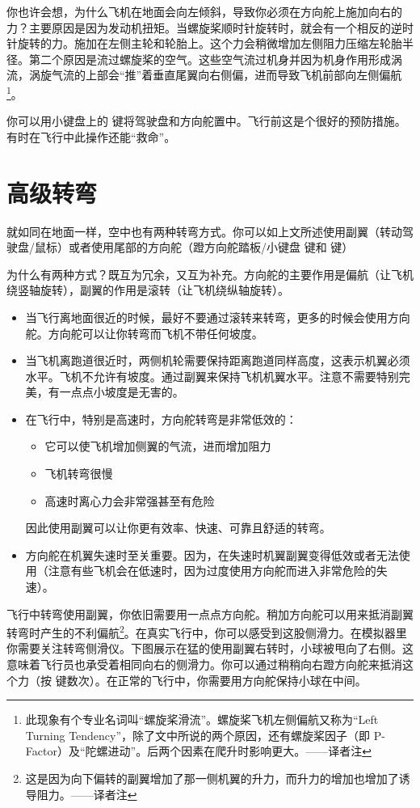 你也许会想，为什么飞机在地面会向左倾斜，导致你必须在方向舵上施加向右的力？主要原因是因为发动机扭矩。当螺旋桨顺时针旋转时，就会有一个相反的逆时针旋转的力。施加在左侧主轮和轮胎上。这个力会稍微增加左侧阻力压缩左轮胎半径。第二个原因是流过螺旋桨的空气。这些空气流过机身并因为机身作用形成涡流，涡旋气流的上部会“推”着垂直尾翼向右侧偏，进而导致飞机前部向左侧偏航\footnote{此现象有个专业名词叫“螺旋桨滑流”。螺旋桨飞机左侧偏航又称为“Left Turning Tendency”，除了文中所说的两个原因，还有螺旋桨因子（即 P-Factor）及“陀螺进动”。后两个因素在爬升时影响更大。——译者注}。

你可以用小键盘上的  键将驾驶盘和方向舵置中。飞行前这是个很好的预防措施。有时在飞行中此操作还能“救命”。

\section{高级转弯}
\label{sec:Turning}

就如同在地面一样，空中也有两种转弯方式。你可以如上文所述使用副翼（转动驾驶盘/鼠标）或者使用尾部的方向舵（蹬方向舵踏板/小键盘  键和  键）

为什么有两种方式？既互为冗余，又互为补充。方向舵的主要作用是偏航（让飞机绕竖轴旋转），副翼的作用是滚转（让飞机绕纵轴旋转）。

\begin{itemize}
    \item 当飞行离地面很近的时候，最好不要通过滚转来转弯，更多的时候会使用方向舵。方向舵可以让你转弯而飞机不带任何坡度。
    \item 当飞机离跑道很近时，两侧机轮需要保持距离跑道同样高度，这表示机翼必须水平。飞机不允许有坡度。通过副翼来保持飞机机翼水平。注意不需要特别完美，有一点点小坡度是无害的。
    \item 在飞行中，特别是高速时，方向舵转弯是非常低效的：
    \begin{itemize}
    \item 它可以使飞机增加侧翼的气流，进而增加阻力
    \item 飞机转弯很慢
    \item 高速时离心力会非常强甚至有危险
    \end{itemize}
    因此使用副翼可以让你更有效率、快速、可靠且舒适的转弯。
    \item 方向舵在机翼失速时至关重要。因为，在失速时机翼副翼变得低效或者无法使用（注意有些飞机会在低速时，因为过度使用方向舵而进入非常危险的失速）。
 \end{itemize}   

飞行中转弯使用副翼，你依旧需要用一点点方向舵。稍加方向舵可以用来抵消副翼转弯时产生的不利偏航\footnote{这是因为向下偏转的副翼增加了那一侧机翼的升力，而升力的增加也增加了诱导阻力。——译者注}。在真实飞行中，你可以感受到这股侧滑力。在模拟器里你需要关注转弯侧滑仪。下图展示在猛的使用副翼右转时，小球被甩向了右侧。这意味着飞行员也承受着相同向右的侧滑力。你可以通过稍稍向右蹬方向舵来抵消这个力（按  键数次）。在正常的飞行中，你需要用方向舵保持小球在中间。

